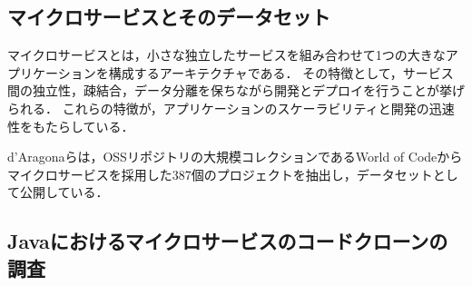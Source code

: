 \documentclass[T,J]{fose}
\begin{document}
\subsection{マイクロサービスとそのデータセット} \label{subsec:dataset}
マイクロサービスとは，小さな独立したサービスを組み合わせて1つの大きなアプリケーションを構成するアーキテクチャである\cite{Honda2023,mo2021existence,zhao2022}．
その特徴として，サービス間の独立性，疎結合，データ分離を保ちながら開発とデプロイを行うことが挙げられる\cite{mo2021existence,zhao2022}．
これらの特徴が，アプリケーションのスケーラビリティと開発の迅速性をもたらしている．


d'Aragonaらは，OSSリポジトリの大規模コレクションであるWorld of Code\cite{WoC}からマイクロサービスを採用した387個のプロジェクトを抽出し，データセットとして公開している\cite{amoroso2024dataset}．


\subsection{Javaにおけるマイクロサービスのコードクローンの調査}
\end{document}
